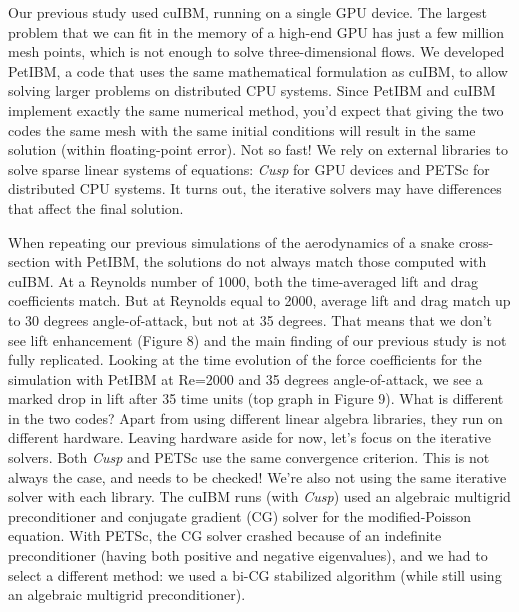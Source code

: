 \documentclass[9pt,twocolumn,twoside]{article}
\newlength{\up}
\begin{document}
Our previous study used cuIBM, running on a single GPU device. 
The largest problem that we can fit in the memory of a high-end GPU has just a few million mesh points, which is not enough to solve three-dimensional flows. 
We developed PetIBM, a code that uses the same mathematical formulation as cuIBM, to allow solving larger problems on distributed CPU systems. 
Since PetIBM and cuIBM implement exactly the same numerical method, you'd expect that giving the two codes the same mesh with the same initial conditions will result in the same solution (within floating-point error). 
Not so fast! 
We rely on external libraries to solve sparse linear systems of equations: \textsl{Cusp} for GPU devices and PETSc for distributed CPU systems. 
It turns out, the iterative solvers may have differences that affect the final solution.

When repeating our previous simulations of the aerodynamics of a snake cross-section with PetIBM, the solutions do not always match those computed with cuIBM. 
At a Reynolds number of 1000, both the time-averaged lift and drag coefficients match. 
But at Reynolds equal to 2000, average lift and drag match up to 30 degrees angle-of-attack, but not at 35 degrees. 
That means that we don't see lift enhancement (Figure 8) and the main finding of our previous study is not fully replicated. 
Looking at the time evolution of the force coefficients for the simulation with PetIBM at Re=2000 and 35 degrees angle-of-attack, we see a marked drop in lift after 35 time units (top graph in Figure 9). 
What is different in the two codes? 
Apart from using different linear algebra libraries, they run on different hardware. 
Leaving hardware aside for now, let's focus on the iterative solvers. 
Both \textsl{Cusp} and PETSc use the same convergence criterion. 
This is not always the case, and needs to be checked! 
We're also not using the same iterative solver with each library. 
The cuIBM runs (with \textsl{Cusp}) used an algebraic multigrid preconditioner and conjugate gradient (CG) solver for the modified-Poisson equation. 
With PETSc, the CG solver crashed because of an indefinite preconditioner (having both positive and negative eigenvalues), and we had to select a different method: we used a bi-CG stabilized algorithm (while still using an algebraic multigrid preconditioner). 
\end{document}
